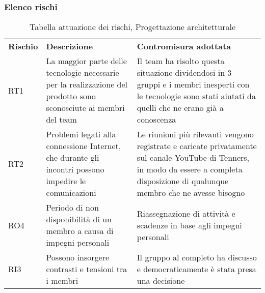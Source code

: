 \subsubsection{Elenco rischi}
\begin{table}[h]
	\caption{Tabella attuazione dei rischi, Progettazione architetturale}
	\begin{center}
		\begin{tabular}{p{2cm}p{6cm}p{6cm}}
			\textbf{Rischio} & \textbf{Descrizione}                                                                                                        & \textbf{Contromisura adottata}                                                                                                                                                   \\RT1 & La maggior parte delle tecnologie necessarie per la realizzazione del prodotto sono sconosciute ai membri del team & Il team ha risolto questa situazione dividendosi in 3 gruppi e i membri inesperti con le tecnologie sono stati aiutati da quelli che ne erano già a conoscenza\\
			RT2 & Problemi legati alla connessione Internet, che durante gli incontri possono impedire le comunicazioni & Le riunioni più rilevanti vengono registrate e caricate privatamente sul canale YouTube di Tenners, in modo da essere a completa disposizione di qualunque membro che ne avesse bisogno
			\\
			RO4 & Periodo di non disponibilità di un membro a causa di impegni personali & Riassegnazione di attività e scadenze in base agli impegni personali
			\\
			RI3 & Possono insorgere contrasti e tensioni tra i membri & Il gruppo al completo ha discusso e democraticamente è stata presa una decisione\\
		\end{tabular}
	\end{center}
\end{table}